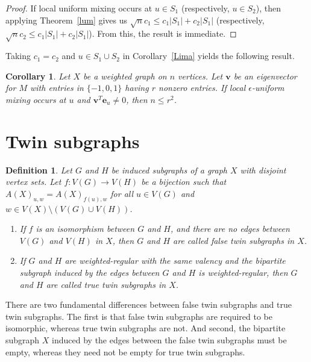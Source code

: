 \documentclass[11pt]{article}
\newtheorem{definition}{Definition}
\newtheorem{corollary}{Corollary}
\newcommand{\be}{\mathbf e}
\newcommand{\bv}{\mathbf v}
\begin{document}
\begin{proof}
If local uniform mixing occurs at $u\in S_1$ (respectively, $u\in S_2$), then applying Theorem~\ref{lum} gives us $\sqrt{n}c_1\leq c_1|S_1|+c_2|S_1|$ (respectively, $\sqrt{n}c_2\leq c_1|S_1|+c_2|S_1|$). From this, the result is immediate.
\end{proof}

Taking $c_1=c_2$ and $u\in S_1\cup S_2$ in Corollary~\ref{Lima} yields the following result.

\begin{corollary}
\label{Cor:01}
Let $X$ be a weighted graph on $n$ vertices. Let $\mathbf{v}$ be an eigenvector for $M$ with entries in $\{-1,0,1\}$ having $r$ nonzero entries. If local $\epsilon$-uniform mixing occurs at $u$ and $\bv^T\be_u\neq 0$, then $n\leq r^2$.
\end{corollary}

\section{Twin subgraphs}
\label{sec:tw}

\begin{definition}
\label{deftw}
Let $G$ and $H$ be induced subgraphs of a graph $X$ with disjoint vertex sets. Let $f:V(G)\rightarrow V(H)$ be a bijection such that $A(X)_{u,w}=A(X)_{f(u),w}$ for all $u\in V(G)$ and $w\in V(X)\setminus (V(G)\cup V(H))$.
\begin{enumerate}
\item If $f$ is an isomorphism between $G$ and $H$, and there are no edges between $V(G)$ and $V(H)$ in $X$, then $G$ and $H$ are called \textit{false twin subgraphs} in $X$. 
\item If $G$ and $H$ are weighted-regular with the same valency and the bipartite subgraph induced by the edges between $G$ and $H$ is weighted-regular, then  $G$ and $H$ are called \textit{true twin subgraphs} in $X$.
\end{enumerate}
\end{definition}

There are two fundamental differences between false twin subgraphs and true twin subgraphs. The first is that false twin subgraphs are required to be isomorphic, whereas true twin subgraphs are not. And second, the bipartite subgraph $X$ induced by the edges between the false twin subgraphs must be empty, whereas they need not be empty for true twin subgraphs. %
\end{document}
